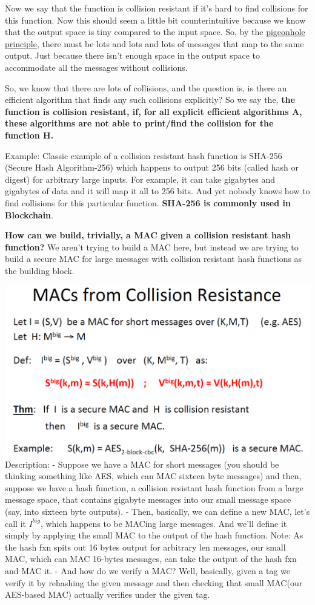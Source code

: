 \documentclass[11pt]{article}
\makeatletter
\def\maxwidth{\ifdim\Gin@nat@width>\linewidth\linewidth
    \else\Gin@nat@width\fi}
\let\Oldincludegraphics\includegraphics
\renewcommand{\includegraphics}[1]{\Oldincludegraphics[width=.8\maxwidth]{#1}}
\makeatother
\begin{document}
Now we say that the function is collision resistant if it's hard to find
collisions for this function. Now this should seem a little bit
counterintuitive because we know that the output space is tiny compared
to the input space. So, by the
\href{https://en.wikipedia.org/wiki/Pigeonhole_principle}{pigeonhole
principle}, there must be lots and lots and lots of messages that map to
the same output. Just because there isn't enough space in the output
space to accommodate all the messages without collisions.

So, we know that there are lots of collisions, and the question is, is
there an efficient algorithm that finds any such collisions explicitly?
So we say the, \textbf{the function is collision resistant, if, for all
explicit efficient algorithms A, these algorithms are not able to
print/find the collision for the function H.}

Example: Classic example of a collision resistant hash function is
SHA-256 (Secure Hash Algorithm-256) which happens to output 256 bits
(called hash or digest) for arbitrary large inputs. For example, it can
take gigabytes and gigabytes of data and it will map it all to 256 bits.
And yet nobody knows how to find collisions for this particular
function. \textbf{SHA-256 is commonly used in Blockchain}.

\textbf{How can we build, trivially, a MAC given a collision resistant
hash function?} We aren't trying to build a MAC here, but instead we are
trying to build a secure MAC for large messages with collision resistant
hash functions as the building block.

\includegraphics{./Images/MACfrmHashFxn.png} Description: - Suppose we
have a MAC for short messages (you should be thinking something like
AES, which can MAC sixteen byte messages) and then, suppose we have a
hash function, a collision resistant hash function from a large message
space, that contains gigabyte messages into our small message space
(say, into sixteen byte outputs). - Then, basically, we can define a new
MAC, let's call it \(I^{big}\), which happens to be MACing large
messages. And we'll define it simply by applying the small MAC to the
output of the hash function. Note: As the hash fxn spits out 16 bytes
output for arbitrary len messages, our small MAC, which can MAC 16-bytes
messages, can take the output of the hash fxn and MAC it. - And how do
we verify a MAC? Well, basically, given a tag we verify it by rehashing
the given message and then checking that small MAC(our AES-based MAC)
actually verifies under the given tag.
\end{document}
